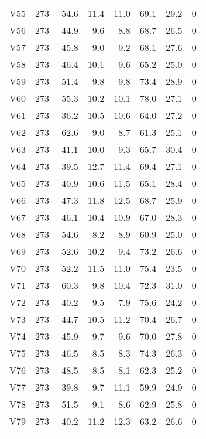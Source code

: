{\begin{longtable}{lrrrrrrr}
  V55 & 273 & -54.6 & 11.4 & 11.0 & 69.1 & 29.2 & 0 \\ 
  V56 & 273 & -44.9 &  9.6 &  8.8 & 68.7 & 26.5 & 0 \\ 
  V57 & 273 & -45.8 &  9.0 &  9.2 & 68.1 & 27.6 & 0 \\ 
  V58 & 273 & -46.4 & 10.1 &  9.6 & 65.2 & 25.0 & 0 \\ 
  V59 & 273 & -51.4 &  9.8 &  9.8 & 73.4 & 28.9 & 0 \\ 
  V60 & 273 & -55.3 & 10.2 & 10.1 & 78.0 & 27.1 & 0 \\ 
  V61 & 273 & -36.2 & 10.5 & 10.6 & 64.0 & 27.2 & 0 \\ 
  V62 & 273 & -62.6 &  9.0 &  8.7 & 61.3 & 25.1 & 0 \\ 
  V63 & 273 & -41.1 & 10.0 &  9.3 & 65.7 & 30.4 & 0 \\ 
  V64 & 273 & -39.5 & 12.7 & 11.4 & 69.4 & 27.1 & 0 \\ 
  V65 & 273 & -40.9 & 10.6 & 11.5 & 65.1 & 28.4 & 0 \\ 
  V66 & 273 & -47.3 & 11.8 & 12.5 & 68.7 & 25.9 & 0 \\ 
  V67 & 273 & -46.1 & 10.4 & 10.9 & 67.0 & 28.3 & 0 \\ 
  V68 & 273 & -54.6 &  8.2 &  8.9 & 60.9 & 25.0 & 0 \\ 
  V69 & 273 & -52.6 & 10.2 &  9.4 & 73.2 & 26.6 & 0 \\ 
  V70 & 273 & -52.2 & 11.5 & 11.0 & 75.4 & 23.5 & 0 \\ 
  V71 & 273 & -60.3 &  9.8 & 10.4 & 72.3 & 31.0 & 0 \\ 
  V72 & 273 & -40.2 &  9.5 &  7.9 & 75.6 & 24.2 & 0 \\ 
  V73 & 273 & -44.7 & 10.5 & 11.2 & 70.4 & 26.7 & 0 \\ 
  V74 & 273 & -45.9 &  9.7 &  9.6 & 70.0 & 27.8 & 0 \\ 
  V75 & 273 & -46.5 &  8.5 &  8.3 & 74.3 & 26.3 & 0 \\ 
  V76 & 273 & -48.5 &  8.5 &  8.1 & 62.3 & 25.2 & 0 \\ 
  V77 & 273 & -39.8 &  9.7 & 11.1 & 59.9 & 24.9 & 0 \\ 
  V78 & 273 & -51.5 &  9.1 &  8.6 & 62.9 & 25.8 & 0 \\ 
  V79 & 273 & -40.2 & 11.2 & 12.3 & 63.2 & 26.6 & 0 \\ 
  \hline
\label{tab:table4}
\end{longtable}
}
